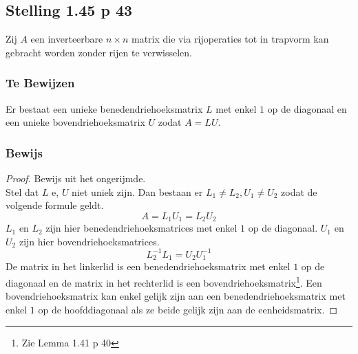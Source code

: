 \documentclass[lineaire_algebra_oplossingen.tex]{subfiles}
\begin{document}
\subsection{Stelling 1.45 p 43}
Zij $A$ een inverteerbare $n\times n$ matrix die via rijoperaties tot in trapvorm kan gebracht worden zonder rijen te verwisselen.
\subsubsection*{Te Bewijzen}
Er bestaat een unieke benedendriehoeksmatrix $L$ met enkel $1$ op de diagonaal en een unieke bovendriehoeksmatrix $U$ zodat $A=LU$.
\subsubsection*{Bewijs}
\begin{proof}
Bewijs uit het ongerijmde.\\
Stel dat $L$ e, $U$ niet uniek zijn. Dan bestaan er $L_1 \neq L_2,U_1 \neq U_2$ zodat de volgende formule geldt.
\[
A = L_1U_1=L_2U_2
\]
$L_1$ en $L_2$ zijn hier benedendriehoeksmatrices met enkel $1$ op de diagonaal. $U_1$ en $U_2$ zijn hier bovendriehoeksmatrices.
\[
L_2^{-1}L_1 = U_2U_1^{-1}
\]
De matrix in het linkerlid is een benedendriehoeksmatrix met enkel $1$ op de diagonaal en de matrix in het rechterlid is een bovendriehoeksmatrix\footnote{Zie Lemma 1.41 p 40}.
Een bovendriehoeksmatrix kan enkel gelijk zijn aan een benedendriehoeksmatrix met enkel $1$ op de hoofddiagonaal als ze beide gelijk zijn aan de eenheidsmatrix.
\end{proof}
\end{document}
